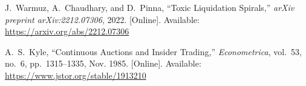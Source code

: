 \documentclass[11pt]{article}
\begin{document}
\bigskip
\begin{thebibliography}{99}

J.~Warmuz, A.~Chaudhary, and D.~Pinna, 
``Toxic Liquidation Spirals,'' 
\emph{arXiv preprint arXiv:2212.07306}, 2022. [Online]. Available: \url{https://arxiv.org/abs/2212.07306}


A.~S.~Kyle, 
``Continuous Auctions and Insider Trading,'' 
\emph{Econometrica}, vol.~53, no.~6, pp.~1315--1335, Nov. 1985. [Online]. Available: \url{https://www.jstor.org/stable/1913210}

\end{thebibliography}
\end{document}
